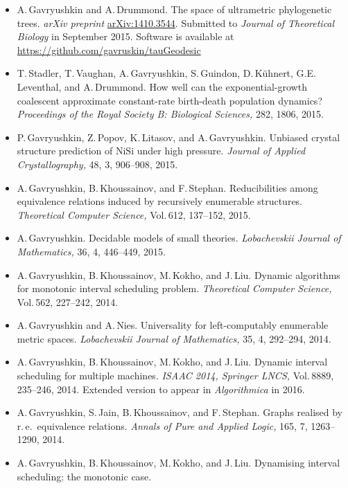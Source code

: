 \documentclass[12pt]{article}
\begin{document}
\iftoggle{full}{
\centerline{\bf Publications}
}{
\centerline{\bf Recent publications}
}
\begin{itemize}
\item A.\,Gavryushkin and A.\,Drummond.
	The space of ultrametric phylogenetic trees.
	{\em arXiv preprint} \href{http://arxiv.org/abs/1410.3544}{arXiv:1410.3544}.
	Submitted to {\em Journal of Theoretical Biology} in September 2015.
	Software is available at
	\href{https://github.com/gavruskin/tauGeodesic}{https://github.com/gavruskin/tauGeodesic}
\item T.\,Stadler, T.\,Vaughan, A.\,Gavryushkin, S.\,Guindon, D.\,K\"uhnert, G.E.\,Leventhal, and A.\,Drummond.
	How well can the exponential-growth coalescent approximate constant-rate birth-death population dynamics?
	{\em Proceedings of the Royal Society B: Biological Sciences,} 282, 1806, 2015.
\item P.\,Gavryushkin, Z.\,Popov, K.\,Litasov, and A.\,Gavryushkin.
	Unbiased crystal structure prediction of $\mathrm{NiSi}$ under high pressure.
	{\em Journal of Applied Crystallography,} 48, 3, 906--908, 2015.
\item A.\,Gavryushkin, B.\,Khoussainov, and F.\,Stephan.
	Reducibilities among equivalence relations induced by recursively enumerable structures.
	{\em Theoretical Computer Science,} Vol.\,612, 137--152, 2015.
\item A.\,Gavryushkin.
	Decidable models of small theories.
	{\em Lobachevskii Journal of Mathematics,} 36, 4, 446--449, 2015.
\item A.\,Gavryushkin, B.\,Khoussainov, M.\,Kokho, and J.\,Liu.
	Dynamic algorithms for monotonic interval scheduling problem.
	{\em Theoretical Computer Science,} Vol.\,562, 227--242, 2014.
\item A.\,Gavryushkin and A.\,Nies.
	Universality for left-computably enumerable  metric spaces.
	{\em Lobachevskii Journal of Mathematics,} 35, 4, 292--294, 2014.
\item A.\,Gavryushkin, B.\,Khoussainov, M.\,Kokho, and J.\,Liu.
	Dynamic interval scheduling for multiple machines.
	{\em ISAAC 2014, Springer LNCS,} Vol.\,8889, 235--246, 2014.
	Extended version to appear in {\em Algorithmica} in 2016.
\item A.\,Gavryushkin, S.\,Jain, B.\,Khoussainov, and F.\,Stephan.
	Graphs realised by r.\,e.\ equivalence relations.
	{\em Annals of Pure and Applied Logic,} 165, 7, 1263--1290, 2014.
\item A.\,Gavryushkin, B.\,Khoussainov, M.\,Kokho, and J.\,Liu.
	Dynamising interval scheduling: the monotonic case.

\end{itemize}
\end{document}
